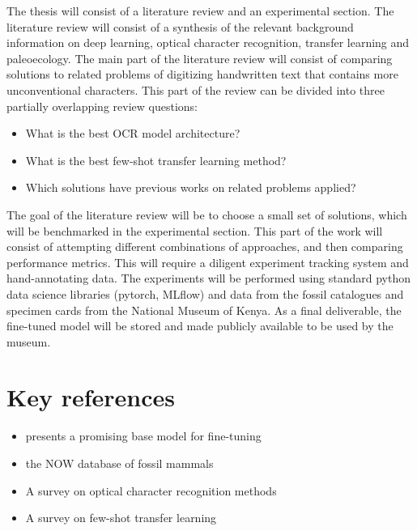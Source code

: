 \documentclass{article}
\begin{document}
The thesis will consist of a literature review and an experimental section.
The literature review will consist of a synthesis of the relevant background 
information on deep learning, optical character recognition, transfer learning and 
paleoecology.
The main part of the literature review will consist of comparing
solutions to related problems of digitizing handwritten text that contains 
more unconventional characters. This part of the review can be divided into three partially overlapping review 
questions:

\begin{itemize}
    \item What is the best OCR model architecture?
    \item What is the best few-shot transfer learning method?
    \item Which solutions have previous works on related problems applied?
\end{itemize}

The goal of the literature review will be to choose a small set of solutions, which will be 
benchmarked in the experimental section. This part of the work will consist of attempting 
different combinations of approaches, and then comparing performance metrics. This will require a 
diligent experiment tracking system and hand-annotating data. The experiments will be performed 
using standard python data science libraries (pytorch, MLflow) and
 data from the fossil catalogues and specimen cards from the National Museum of Kenya. As a final deliverable,
 the fine-tuned model will be stored and made publicly available to be used by the museum.

\section{Key references}

\begin{itemize}
    \item \cite{li2021trocr} presents a promising base model for fine-tuning
    \item \cite{Žliobaitė2023} the NOW database of fossil mammals
    \item \cite{9151144} A survey on optical character recognition methods 
    \item \cite{10.1145/3582688} A survey on few-shot transfer learning
\end{itemize}

\printbibliography
\end{document}
